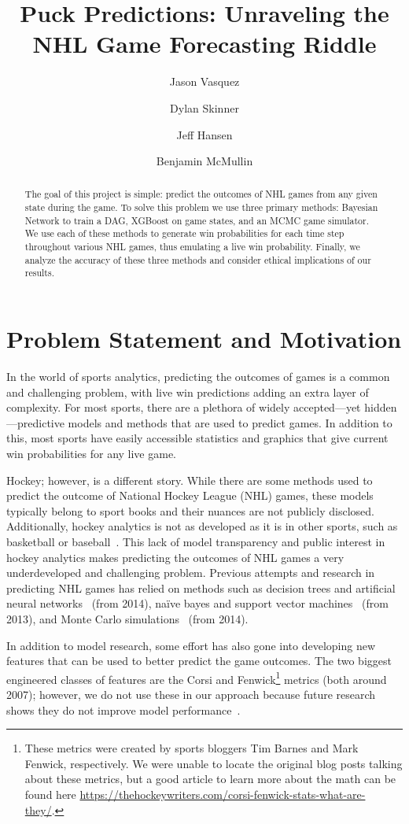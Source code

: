 \documentclass[11pt]{article}
\title{Puck Predictions: Unraveling the NHL Game Forecasting Riddle}
\author{Jason Vasquez \and Dylan Skinner \and Jeff Hansen \and Benjamin McMullin}
\begin{document}
\maketitle

\begin{abstract}
    The goal of this project is simple: predict the outcomes of NHL games from any given state during the game. To solve this problem we use three primary methods: Bayesian Network to train a DAG, XGBoost on game states, and an MCMC game simulator. We use each of these methods to generate win probabilities for each time step throughout various NHL games, thus emulating a live win probability. Finally, we analyze the accuracy of these three methods and consider ethical implications of our results.
\end{abstract}

\section{Problem Statement and Motivation}
In the world of sports analytics, predicting the outcomes of games is a common and challenging problem, with live win predictions adding
an extra layer of complexity. For most sports, there are a plethora of widely accepted—yet hidden—predictive models and methods that are used to
predict games. In addition to this, most sports have easily accessible statistics and graphics that give current win probabilities for any live game.

Hockey; however, is a different story. While there are some methods used to predict the outcome of National Hockey League (NHL) games, these models
typically belong to sport books and their nuances are not publicly disclosed. Additionally, hockey analytics is not as
developed as it is in other sports, such as basketball or baseball~\cite{Brooks-Davis}. This lack of model transparency and public interest in hockey analytics
makes predicting the outcomes of NHL games a very underdeveloped and challenging problem. Previous attempts and research in predicting NHL games
has relied on methods such as decision trees and artificial neural networks~\cite{pishcedda} (from 2014), naïve bayes and support vector machines~\cite{weissbock2013use} (from 2013),
and Monte Carlo simulations~\cite{Weissbock2014ForecastingSI} (from 2014).

In addition to model research, some effort has also gone into developing new features that can be used to better predict the game outcomes. 
The two biggest engineered classes of features are the Corsi
 and Fenwick\footnote{These metrics were created by sports bloggers Tim Barnes and Mark Fenwick, respectively. 
 We were unable to locate the original blog posts talking about these metrics, but a good article to learn more about the math can be
 found here \url{https://thehockeywriters.com/corsi-fenwick-stats-what-are-they/}.} metrics (both around 2007); however, we do not use these
 in our approach because future research shows they do not improve model performance~\cite{rinkstats_corsi_fenwick}.
\end{document}
